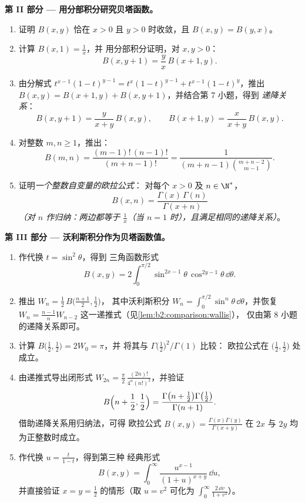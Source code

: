 \begin{problem}
\medskip
\noindent\textbf{第 II 部分 --- 用分部积分研究贝塔函数。}
\begin{enumerate}[resume]
  \item 证明 $B(x,y)$ 恰在 $x > 0$ 且 $y >
        0$ 时收敛，且 $B(x,y) = B(y,x)$。
  \item 计算 $B(x, 1) = \frac1x$，并
        用分部积分证明，对 $x, y > 0$：
        \[
        B(x, y+1) = \frac{y}{x}\,B(x+1, y) .
        \]
  \item 由分解式 $t^{x-1}(1-t)^{y-1} =
        t^{x}(1-t)^{y-1} + t^{x-1}(1-t)^{y}$，推出 $B(x,y) =
        B(x+1,y) + B(x,y+1)$，并结合第 7 小题，得到
        \emph{递降关系}：
        \[
        B(x, y+1) = \frac{y}{x+y}\,B(x,y),
        \qquad
        B(x+1, y) = \frac{x}{x+y}\,B(x,y) .
        \]
  \item 对整数 $m, n \geq 1$，推出：
        \[
        B(m, n) = \frac{(m-1)!\,(n-1)!}{(m+n-1)!}
        = \frac{1}{(m+n-1)\binom{m+n-2}{m-1}} .
        \]
  \item 证明\emph{一个整数自变量的欧拉公式}：
        对每个 $x > 0$ 及 $n \in \N^*$，
        \[
        B(x, n) = \frac{\Gamma(x)\,\Gamma(n)}{\Gamma(x + n)}
        \]
        \emph{（对 $n$ 作归纳：两边都等于 $\frac1x$（当 $n
        = 1$ 时），且满足相同的递降关系）}。
\end{enumerate}

\medskip
\noindent\textbf{第 III 部分 --- 沃利斯积分作为贝塔函数值。}
\begin{enumerate}[resume]
  \item 作代换 $t = \sin^2\theta$，得到
        三角函数形式
        \[
        B(x, y) = 2\int_0^{\pi/2}
        \sin^{2x-1}\theta\,\cos^{2y-1}\theta\,\dd\theta .
        \]
  \item 推出 $W_n = \frac12\,B\bigl(\frac{n+1}2, \frac12\bigr)$，
        其中沃利斯积分 $W_n = \int_0^{\pi/2}\sin^n
        \theta\,\dd\theta$，并恢复 $W_n =
        \frac{n-1}{n}W_{n-2}$ 这一递推式（见\cref{lem:b2:comparison:wallis}），
        仅由第 8 小题的递降关系即可。
  \item 计算 $B\bigl(\frac12, \frac12\bigr) = 2W_0 = \pi$，并
        将其与 $\Gamma\bigl(\frac12\bigr)^2/\Gamma(1)$ 比较：
        欧拉公式在 $\bigl(\frac12,
        \frac12\bigr)$ 处成立。
  \item 由递推式导出闭形式 $W_{2n} = \frac\pi2\,
        \frac{(2n)!}{4^n(n!)^2}$，并验证
        \[
        B\Bigl(n + \frac12, \frac12\Bigr)
        = \frac{\Gamma\bigl(n + \frac12\bigr)\Gamma\bigl(
        \frac12\bigr)}{\Gamma(n+1)} .
        \]
        借助递降关系用归纳法，可得
        欧拉公式 $B(x,y) =
        \frac{\Gamma(x)\Gamma(y)}{\Gamma(x+y)}$ 在
        $2x$ 与 $2y$ 均为正整数时成立。
  \item 作代换 $u = \frac{t}{1-t}$，得到第三种
        经典形式
        \[
        B(x,y) = \int_0^\infty
        \frac{u^{x-1}}{(1+u)^{x+y}}\,\dd u ,
        \]
        并直接验证 $x = y = \frac12$ 的情形（取 $u = v^2$
        可化为 $\int_0^\infty\frac{2\,\dd v}{1+v^2}$）。
\end{enumerate}


\end{problem}
